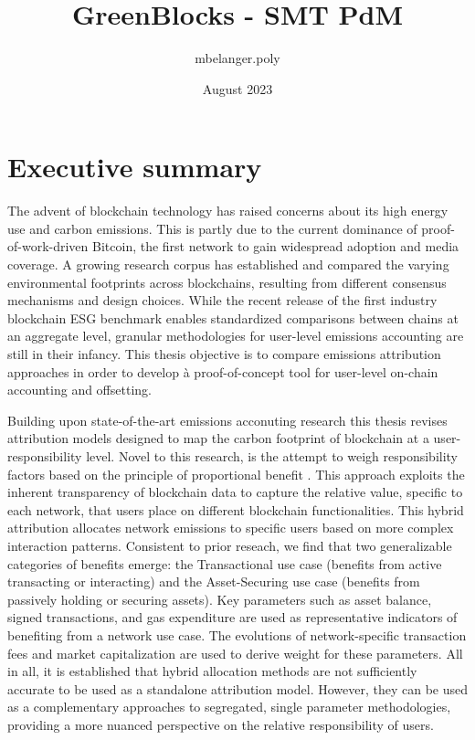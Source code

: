 \documentclass[11pt]{report}
\title{GreenBlocks - SMT PdM}
\author{mbelanger.poly}
\date{August 2023}
\begin{document}

\section*{Executive summary}


The advent of blockchain technology has raised concerns about its high energy use and carbon emissions. This is partly due to the current dominance of proof-of-work-driven Bitcoin, the first network to gain widespread adoption and media coverage. A growing research corpus has established and compared the varying environmental footprints across blockchains, resulting from different consensus mechanisms and design choices. While the recent release of the first industry blockchain ESG benchmark enables standardized comparisons between chains at an aggregate level, granular methodologies for user-level emissions accounting are still in their infancy. This thesis objective is to compare emissions attribution approaches in order to develop à proof-of-concept tool for user-level on-chain accounting and offsetting.

Building upon state-of-the-art emissions acconuting research this thesis revises attribution models designed to map the carbon footprint of blockchain at a user-responsibility level. Novel to this research, is the attempt to weigh responsibility factors based on the principle of proportional benefit . This approach exploits the inherent transparency of blockchain data to capture the relative value, specific to each network, that users place on different blockchain functionalities. This hybrid attribution allocates network emissions to specific users based on more complex interaction patterns. Consistent to prior reseach, we find that two generalizable categories of benefits emerge: the Transactional use case (benefits from active transacting or interacting) and the Asset-Securing use case (benefits from passively holding or securing assets). Key parameters such as asset balance, signed transactions, and gas expenditure are used as representative indicators of benefiting from a network use case. The evolutions of network-specific transaction fees and market capitalization are used to derive weight for these parameters. All in all, it is established that hybrid allocation methods are not sufficiently accurate to be used as a standalone attribution model. However, they can be used as a complementary approaches to segregated, single parameter methodologies, providing a more nuanced perspective on the relative responsibility of users.
\end{document}
